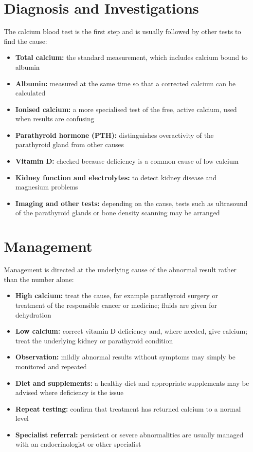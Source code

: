\section*{Diagnosis and Investigations}
The calcium blood test is the first step and is usually followed by other tests to find the cause:
\begin{itemize}
    \item \textbf{Total calcium:} the standard measurement, which includes calcium bound to albumin
    \item \textbf{Albumin:} measured at the same time so that a corrected calcium can be calculated
    \item \textbf{Ionised calcium:} a more specialised test of the free, active calcium, used when results are confusing
    \item \textbf{Parathyroid hormone (PTH):} distinguishes overactivity of the parathyroid gland from other causes
    \item \textbf{Vitamin D:} checked because deficiency is a common cause of low calcium
    \item \textbf{Kidney function and electrolytes:} to detect kidney disease and magnesium problems
    \item \textbf{Imaging and other tests:} depending on the cause, tests such as ultrasound of the parathyroid glands or bone density scanning may be arranged
\end{itemize}

\section*{Management}
Management is directed at the underlying cause of the abnormal result rather than the number alone:
\begin{itemize}
    \item \textbf{High calcium:} treat the cause, for example parathyroid surgery or treatment of the responsible cancer or medicine; fluids are given for dehydration
    \item \textbf{Low calcium:} correct vitamin D deficiency and, where needed, give calcium; treat the underlying kidney or parathyroid condition
    \item \textbf{Observation:} mildly abnormal results without symptoms may simply be monitored and repeated
    \item \textbf{Diet and supplements:} a healthy diet and appropriate supplements may be advised where deficiency is the issue
    \item \textbf{Repeat testing:} confirm that treatment has returned calcium to a normal level
    \item \textbf{Specialist referral:} persistent or severe abnormalities are usually managed with an endocrinologist or other specialist
\end{itemize}

